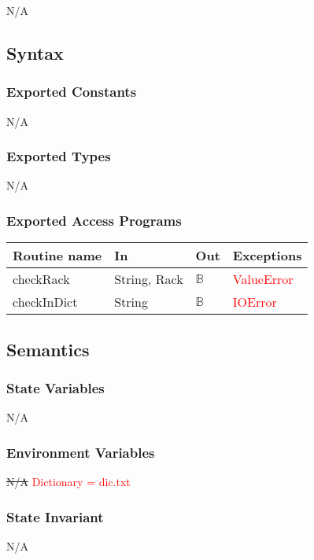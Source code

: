 \documentclass[12pt]{article}
\begin{document}
N/A

\subsection* {Syntax}

\subsubsection* {Exported Constants}
N/A
\subsubsection* {Exported Types}

N/A

\subsubsection* {Exported Access Programs}

\begin{tabular}{| l | l | l | l |}
\hline
\textbf{Routine name} & \textbf{In} & \textbf{Out} & \textbf{Exceptions}\\
\hline
checkRack & String, Rack & $\mathbb{B}$ & \textcolor{red}{ValueError}\\
\hline
checkInDict & String & $\mathbb{B}$ &\textcolor{red}{IOError} \\
\hline
\end{tabular}

\subsection* {Semantics}

\subsubsection* {State Variables}

N/A

\subsubsection* {Environment Variables}

\sout{N/A} \textcolor{red}{Dictionary = dic.txt}

\subsubsection* {State Invariant}

N/A
\end{document}
